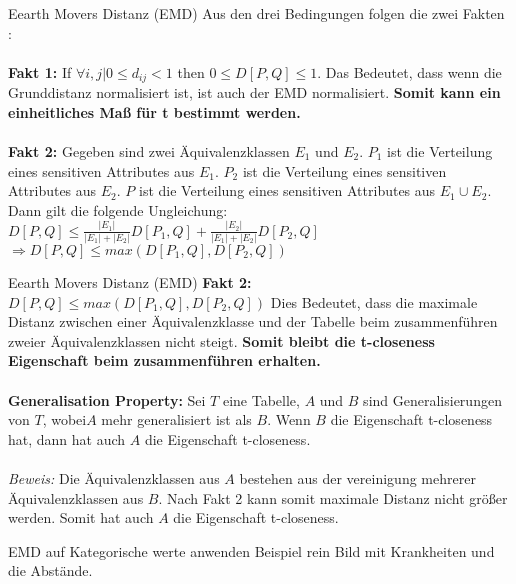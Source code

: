 \begin{frame}{Eearth Movers Distanz (EMD)}
Aus den drei Bedingungen folgen die zwei Fakten \cite{Li2007t-closseness}:\\
\ \\
\textbf{Fakt 1:} If $\forall i,j | 0 \le d_{ij} < 1$ then $0 \le D[P,Q]  \le 1$. 
Das Bedeutet, dass wenn die Grunddistanz normalisiert ist, ist auch der EMD normalisiert. \textbf{Somit kann ein einheitliches Maß für t bestimmt werden.}\\
\ \\
\textbf{Fakt 2:} Gegeben sind zwei Äquivalenzklassen $E_1$ und $E_2$.
$P_1$ ist die Verteilung eines sensitiven Attributes aus $E_1$.
$P_2$ ist die Verteilung eines sensitiven Attributes aus $E_2$.
$P$ ist die Verteilung eines sensitiven Attributes aus $E_1 \cup E_2$. Dann gilt die folgende Ungleichung: \\
$D[P,Q] \le \frac{|E_1|}{|E_1|+|E_2|}D[P_1,Q] + \frac{|E_2|}{|E_1|+|E_2|}D[P_2,Q]$\\
$\Rightarrow D[P,Q] \le max(D[P_1,Q], D[P_2,Q])$ 
\end{frame}

\begin{frame}{Eearth Movers Distanz (EMD)}
\textbf{Fakt 2:} $D[P,Q] \le max(D[P_1,Q], D[P_2,Q])$ 
Dies Bedeutet, dass die maximale Distanz zwischen einer Äquivalenzklasse und der Tabelle beim zusammenführen zweier Äquivalenzklassen nicht steigt. \textbf{Somit bleibt die t-closeness Eigenschaft beim zusammenführen erhalten.} \\ 
\ \\
\textbf{Generalisation Property:} Sei $T$ eine Tabelle, $A$ und $B$ sind Generalisierungen von $T$, wobei$A$ mehr generalisiert ist als $B$. Wenn $B$ die Eigenschaft t-closeness hat, dann hat auch $A$ die Eigenschaft t-closeness.\\
\ \\
\textit{Beweis:} Die Äquivalenzklassen aus $A$ bestehen aus der vereinigung mehrerer Äquivalenzklassen aus $B$. Nach Fakt 2 kann somit maximale Distanz nicht größer werden. Somit hat auch $A$ die Eigenschaft t-closeness.  
\end{frame}

\begin{frame} {EMD auf Kategorische werte anwenden}
Beispiel rein Bild mit Krankheiten und die Abstände.
\end{frame}

